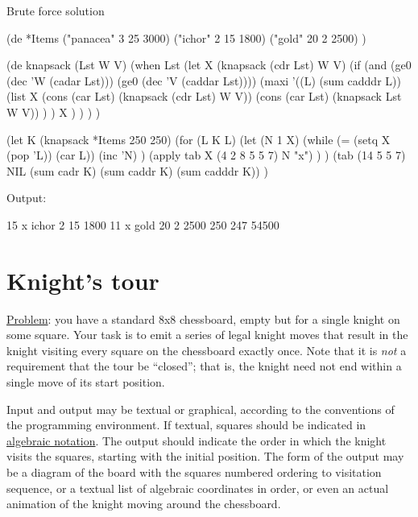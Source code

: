 \begin{wideverbatim}

Brute force solution

(de *Items
   ("panacea"  3  25  3000)
   ("ichor"    2  15  1800)
   ("gold"    20   2  2500) )

(de knapsack (Lst W V)
   (when Lst
      (let X (knapsack (cdr Lst) W V)
         (if (and (ge0 (dec 'W (cadar Lst))) (ge0 (dec 'V (caddar Lst))))
            (maxi
               '((L) (sum cadddr L))
               (list
                  X
                  (cons (car Lst) (knapsack (cdr Lst) W V))
                  (cons (car Lst) (knapsack Lst W V)) ) )
            X ) ) ) )

(let K (knapsack *Items 250 250)
   (for (L K  L)
      (let (N 1  X)
         (while (= (setq X (pop 'L)) (car L))
            (inc 'N) )
         (apply tab X (4 2 8 5 5 7) N "x") ) )
   (tab (14 5 5 7) NIL (sum cadr K) (sum caddr K) (sum cadddr K)) )

Output:

  15 x   ichor    2   15   1800
  11 x    gold   20    2   2500
                250  247  54500

\end{wideverbatim}

\pagebreak{}
\section*{Knight's tour}

\href{http://en.wikipedia.org/wiki/Knight\%27s\_tour}{Problem}: you have
a standard 8x8 chessboard, empty but for a single knight on some square.
Your task is to emit a series of legal knight moves that result in the
knight visiting every square on the chessboard exactly once. Note that
it is \emph{not} a requirement that the tour be ``closed''; that is, the
knight need not end within a single move of its start position.

Input and output may be textual or graphical, according to the
conventions of the programming environment. If textual, squares should
be indicated in
\href{http://en.wikipedia.org/wiki/Algebraic\_chess\_notation}{algebraic
notation}. The output should indicate the order in which the knight
visits the squares, starting with the initial position. The form of the
output may be a diagram of the board with the squares numbered ordering
to visitation sequence, or a textual list of algebraic coordinates in
order, or even an actual animation of the knight moving around the
chessboard.

